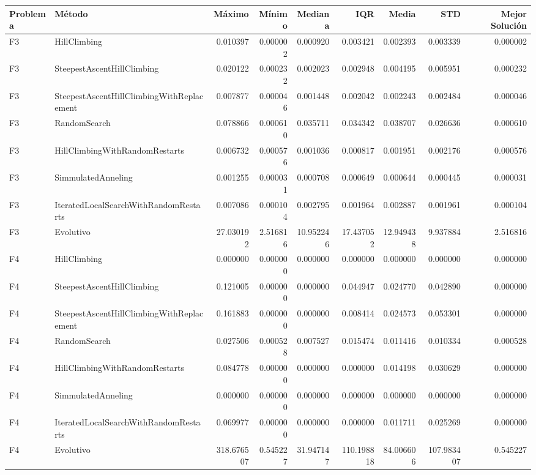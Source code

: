 \begin{tabular}{llrrrrrrr}
\toprule
Problema & Método & Máximo & Mínimo & Mediana & IQR & Media & STD & Mejor Solución \\
\midrule
F3 & HillClimbing & 0.010397 & 0.000002 & 0.000920 & 0.003421 & 0.002393 & 0.003339 & 0.000002 \\
F3 & SteepestAscentHillClimbing & 0.020122 & 0.000232 & 0.002023 & 0.002948 & 0.004195 & 0.005951 & 0.000232 \\
F3 & SteepestAscentHillClimbingWithReplacement & 0.007877 & 0.000046 & 0.001448 & 0.002042 & 0.002243 & 0.002484 & 0.000046 \\
F3 & RandomSearch & 0.078866 & 0.000610 & 0.035711 & 0.034342 & 0.038707 & 0.026636 & 0.000610 \\
F3 & HillClimbingWithRandomRestarts & 0.006732 & 0.000576 & 0.001036 & 0.000817 & 0.001951 & 0.002176 & 0.000576 \\
F3 & SimmulatedAnneling & 0.001255 & 0.000031 & 0.000708 & 0.000649 & 0.000644 & 0.000445 & 0.000031 \\
F3 & IteratedLocalSearchWithRandomRestarts & 0.007086 & 0.000104 & 0.002795 & 0.001964 & 0.002887 & 0.001961 & 0.000104 \\
F3 & Evolutivo & 27.030192 & 2.516816 & 10.952246 & 17.437052 & 12.949438 & 9.937884 & 2.516816 \\
F4 & HillClimbing & 0.000000 & 0.000000 & 0.000000 & 0.000000 & 0.000000 & 0.000000 & 0.000000 \\
F4 & SteepestAscentHillClimbing & 0.121005 & 0.000000 & 0.000000 & 0.044947 & 0.024770 & 0.042890 & 0.000000 \\
F4 & SteepestAscentHillClimbingWithReplacement & 0.161883 & 0.000000 & 0.000000 & 0.008414 & 0.024573 & 0.053301 & 0.000000 \\
F4 & RandomSearch & 0.027506 & 0.000528 & 0.007527 & 0.015474 & 0.011416 & 0.010334 & 0.000528 \\
F4 & HillClimbingWithRandomRestarts & 0.084778 & 0.000000 & 0.000000 & 0.000000 & 0.014198 & 0.030629 & 0.000000 \\
F4 & SimmulatedAnneling & 0.000000 & 0.000000 & 0.000000 & 0.000000 & 0.000000 & 0.000000 & 0.000000 \\
F4 & IteratedLocalSearchWithRandomRestarts & 0.069977 & 0.000000 & 0.000000 & 0.000000 & 0.011711 & 0.025269 & 0.000000 \\
F4 & Evolutivo & 318.676507 & 0.545227 & 31.947147 & 110.198818 & 84.006606 & 107.983407 & 0.545227 \\

\end{tabular}
